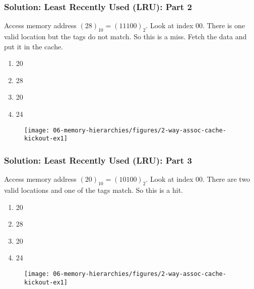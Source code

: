 {\begin{frame}
\end{frame}

\begin{frame}\frametitle{Solution: Least Recently Used (LRU): Part 2}
Access memory address $(28)_{10}=(11100)_2$. Look at index 00. There is one valid location but the tags do not match. So this is a miss. Fetch the data and put it in the cache.
\begin{enumerate}
\item {\color{gray}20}
\item {\color{gray}28}
\item 20
\item 24
\end{enumerate}
\begin{figure}[H]
\centering
{\texttt{[image: 06-memory-hierarchies/figures/2-way-assoc-cache-kickout-ex1]}}
\end{figure}

\end{frame}

\begin{frame}\frametitle{Solution: Least Recently Used (LRU): Part 3}
Access memory address $(20)_{10}=(10100)_2$. Look at index 00. There are two valid locations and one of the tags match. So this is a hit.
\begin{enumerate}
\item {\color{gray}20}
\item {\color{gray}28}
\item {\color{gray}20}
\item 24
\end{enumerate}
\begin{figure}[H]
\centering
{\texttt{[image: 06-memory-hierarchies/figures/2-way-assoc-cache-kickout-ex1]}}
\end{figure}

\end{frame}

}
